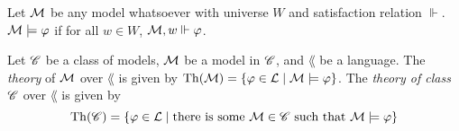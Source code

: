 \documentclass[letterpaper]{article}
\begin{document}
\begin{definition}
    Let $\mathcal{M}$ be any model whatsoever with universe $W$ and satisfaction relation $\Vdash$.  $\mathcal{M} \models \varphi$ if for all $w \in W$, $\mathcal{M}, w \Vdash \varphi$.
\end{definition}

\begin{definition}
    Let $\mathscr{C}$ be a class of models, $\mathcal{M}$ be a model in $\mathscr{C}$, and $\lang$ be a language.  The \emph{theory} of $\mathcal{M}$ over $\lang$ is given by $\mathrm{Th}( \mathcal{M} ) = \{ \varphi \in \mathcal{L} \mid \mathcal{M} \models \varphi \}$.  The \emph{theory of class $\mathscr{C}$} over $\lang$ is given by 
    \[
        \mathrm{Th}( \mathscr{C} ) = \{ \varphi \in \mathcal{L} \mid \textrm{there is some } \mathcal{M} \in \mathscr{C} \textrm{ such that } \mathcal{M} \models \varphi \}
    \]
\end{definition}
\end{document}
